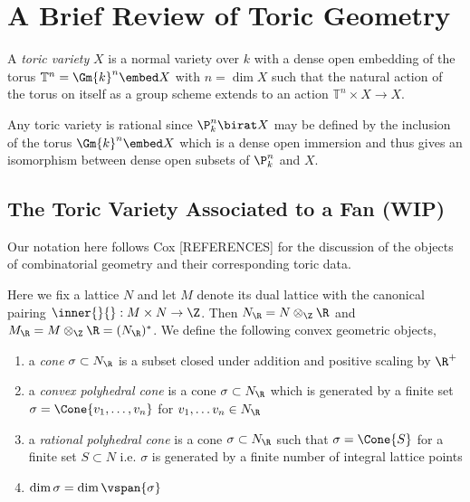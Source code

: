 \documentclass[12pt]{article}
\begin{document}
\tableofcontents

\section{A Brief Review of Toric Geometry}

\renewcommand{\T}{\mathbb{T}}

\begin{defn}
A \textit{toric variety} $X$ is a normal variety over $k$ with a dense open embedding of the torus $\T^n = \Gm{k}^n \embed X$ with $n = \dim{X}$ such that the natural action of the torus on itself as a group scheme extends to an action $\T^n \times X \to X$. 
\end{defn}

\begin{rmk}
Any toric variety is rational since $\P^n_k \birat X$ may be defined by the inclusion of the torus $\Gm{k}^n \embed X$ which is a dense open immersion and thus gives an isomorphism between dense open subsets of $\P^n_k$ and $X$.
\end{rmk}


\subsection{The Toric Variety Associated to a Fan (WIP)}

Our notation here follows Cox [REFERENCES] for the discussion of the objects of combinatorial geometry and their corresponding toric data.

\begin{defn}
Here we fix a lattice $N$ and let $M$ denote its dual lattice with the canonical pairing $\inner{}{} : M \times N \to \Z$. Then $N_\R = N \otimes_\Z \R$ and $M_\R = M \otimes_\Z \R = (N_\R)^*$. We define the following convex geometric objects,
\begin{enumerate}
\item a \textit{cone} $\sigma \subset N_\R$ is a subset closed under addition and positive scaling by $\R^+$
\item a \textit{convex polyhedral cone} is a cone $\sigma \subset N_\R$ which is generated by a finite set $\sigma = \Cone{v_1, \dots, v_n }$ for $v_1, \dots v_n \in N_\R$
\item a \textit{rational polyhedral cone} is a cone $\sigma \subset N_\R$ such that $\sigma = \Cone{S}$ for a finite set $S \subset N$ i.e. $\sigma$ is generated by a finite number of integral lattice points
\item $\dim{\sigma} = \dim{\vspan{\sigma}}$
\end{enumerate}
\end{defn}
\end{document}
